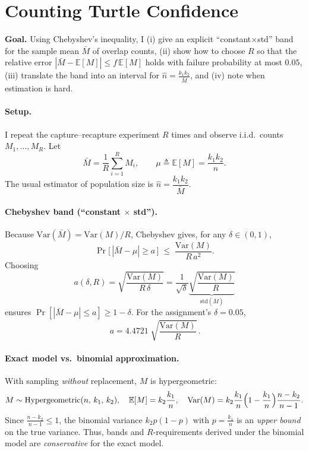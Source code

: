 \section{Counting Turtle Confidence}
\textbf{Goal.} Using Chebyshev’s inequality, I (i) give an explicit “constant$\times$std” band for the sample mean $\bar M$ of overlap counts, (ii) show how to choose $R$ so that the relative error $|\bar M-\mathbb{E}[M]|\le f\,\mathbb{E}[M]$ holds with failure probability at most $0.05$, (iii) translate the band into an interval for $\hat n=\frac{k_1k_2}{\bar M}$, and (iv) note when estimation is hard.

\paragraph{Setup.}
I repeat the capture–recapture experiment $R$ times and observe i.i.d.\ counts $M_1,\dots,M_R$.
Let
\[
\bar M=\frac{1}{R}\sum_{i=1}^R M_i,
\qquad
\mu\triangleq \mathbb{E}[M]=\frac{k_1k_2}{n}.
\]
The usual estimator of population size is $\hat n=\dfrac{k_1k_2}{\bar M}$.

\paragraph{Chebyshev band (“constant $\times$ std”).}
Because $\mathrm{Var}(\bar M)=\mathrm{Var}(M)/R$, Chebyshev gives, for any $\delta\in(0,1)$,
\[
\Pr\!\big[\,|\bar M-\mu|\ge a\,\big]\;\le\; \frac{\mathrm{Var}(M)}{R\,a^2}.
\]
Choosing
\[
\boxed{\,a(\delta,R)=\sqrt{\frac{\mathrm{Var}(M)}{R\,\delta}}
=\frac{1}{\sqrt{\delta}}\underbrace{\sqrt{\frac{\mathrm{Var}(M)}{R}}}_{\mathrm{std}(\bar M)}\,}
\]
ensures $\Pr[|\bar M-\mu|\le a]\ge 1-\delta$. For the assignment’s $\delta=0.05$,
\[
\boxed{\,a=4.4721\;\sqrt{\frac{\mathrm{Var}(M)}{R}}\,}.
\]

\paragraph{Exact model vs.\ binomial approximation.}
With sampling \emph{without} replacement, $M$ is hypergeometric:
\[
M\sim \mathrm{Hypergeometric}(n,\,k_1,\,k_2),\quad
\mathbb{E}[M]=k_2\frac{k_1}{n},\quad
\mathrm{Var}(M)=k_2\frac{k_1}{n}\Bigl(1-\frac{k_1}{n}\Bigr)\frac{n-k_2}{n-1}.
\]
Since $\frac{n-k_2}{n-1}\le 1$, the binomial variance $k_2p(1-p)$ with $p=\frac{k_1}{n}$ is an \emph{upper bound} on the true variance. Thus, bands and $R$-requirements derived under the binomial model are \emph{conservative} for the exact model.

